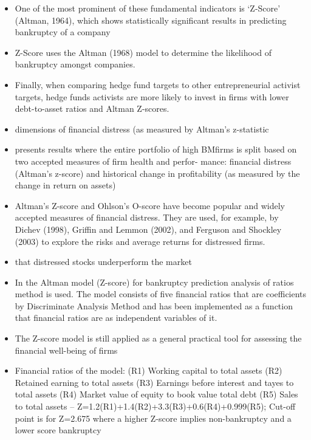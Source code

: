 \documentclass[12pt]{article}
\begin{document}
    \begin{itemize}
        \item One of the most prominent of these fundamental indicators is ‘Z-Score’ (Altman, 1964), which shows statistically significant results in predicting bankruptcy of a company \citep{Mohr2012}

        \item Z-Score uses the Altman (1968) model to determine the likelihood of bankruptcy amongst companies. \citep{Klein2009}

        \item Finally, when comparing hedge fund targets to other entrepreneurial activist targets, hedge funds activists are more likely to invest in firms with lower debt-to-asset ratios and Altman Z-scores.\citep{Klein2009}

        \item dimensions of financial distress (as measured by Altman's z-statistic \citep{Piotroski2000}

        \item presents results where the entire portfolio of high BMfirms is split based on two accepted measures of firm health and perfor- mance: financial distress (Altman's z-score) and historical change in profitability (as measured by the change in return on assets) \citep{Piotroski2000}

        \item Altman’s Z-score and Ohlson’s O-score have become popular and widely accepted measures of financial distress. They are used, for example, by Dichev (1998), Griffin and Lemmon (2002), and Ferguson and Shockley (2003) to explore the risks and average returns for distressed firms. \citep{Campbell2008}

        \item that distressed stocks underperform the market \citep{Campbell2008}

        \item In the Altman model (Z-score) for bankruptcy prediction analysis of ratios method is used. The model consists of five financial ratios that are coefficients by Discriminate Analysis Method and has been implemented as a function that financial ratios are as independent variables of it. \citep{Karamzadeh2013}

        \item The Z-score model is still applied as a general practical tool for assessing the financial well-being of firms

        \item Financial ratios of the model: (R1) Working capital to total assets (R2) Retained earning to total assets (R3) Earnings before interest and tayes to total assets (R4) Market value of equity to book value total debt (R5) Sales to total assets -- Z=1.2(R1)+1.4(R2)+3.3(R3)+0.6(R4)+0.999(R5); Cut-off point is for Z=2.675 where a higher Z-score implies non-bankruptcy and a lower score bankruptcy \citep{Kleinert2014}


\end{itemize}
\end{document}
